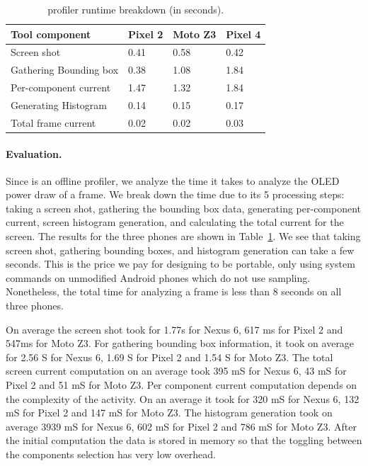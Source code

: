 \begin{table}[htb]
\begin{center}
	\centering
	\caption{\appwithlink profiler runtime breakdown (in seconds).}
	\label{tab:tooloverhead}
        \vspace{-0.1in}
    {\footnotesize
                \begin{tabular*}{\columnwidth}{ | p{} | p{} | p{} | p{} | }
		\hline
		Tool component        	&  Pixel 2 & Moto Z3 & Pixel 4\\
		\hline
		Screen shot	        	&  0.41 & 0.58 & 0.42 \\
		Gathering Bounding box  &  0.38 & 1.08 & 1.84 \\
		Per-component current	&  1.47 & 1.32 & 1.84 \\
		Generating Histogram	&  0.14 & 0.15 & 0.17 \\  
		Total frame current     &  0.02 & 0.02 & 0.03 \\
		\hline
	\end{tabular*}
	}
\end{center}
\vspace{-0.15in}
\end{table}

\paragraph{Evaluation.}
Since \appwithlink is an offline profiler,
we analyze the time it takes to analyze the OLED power draw of a frame.
We break down the time due
to its 5 processing steps: taking a screen shot, gathering the bounding box
data, generating per-component current, screen histogram generation,
and calculating the total current for the screen.  The results for the
three phones are shown in Table~\ref{tab:tooloverhead}.  We see that
taking screen shot, gathering bounding boxes, and histogram generation can
take a few seconds. This is the price we pay
for designing \appwithlink to be portable, \ie  only using system
commands on unmodified Android phones which do not use sampling.
Nonetheless, the total time for analyzing a frame is less than 8
seconds on all three phones.



On average the screen shot took for 1.77s for Nexus 6, 617
ms for Pixel 2 and 547ms for Moto Z3.  For gathering bounding box
information, it took on average for 2.56 S for Nexus 6, 1.69 S for
Pixel 2 and 1.54 S for Moto Z3.  The total screen current computation
on an average took 395 mS for Nexus 6, 43 mS for Pixel 2 and 51 mS for
Moto Z3.  Per component current computation depends on the complexity
of the activity. On an average it took for 320 mS for Nexus 6, 132 mS
for Pixel 2 and 147 mS for Moto Z3.  The histogram generation took on
average 3939 mS for Nexus 6, 602 mS for Pixel 2 and 786 mS for Moto
Z3.  After the initial computation the data is stored in memory so
that the toggling between the components selection has very low
overhead.
\fi

